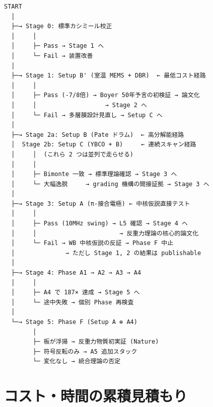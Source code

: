 \documentclass[11pt,a4paper]{article}
\begin{document}
\begin{tcolorbox}[colback=gray!5,colframe=gray!50!black,title=実験順序の決定木]
\small
\begin{verbatim}
START
  │
  ├─→ Stage 0: 標準カシミール校正
  │     │
  │     ├─ Pass → Stage 1 へ
  │     └─ Fail → 装置改善
  │
  ├─→ Stage 1: Setup B' (室温 MEMS + DBR)  ← 最低コスト経路
  │     │
  │     ├─ Pass (-7/8倍) → Boyer 50年予言の初検証 → 論文化
  │     │                   → Stage 2 へ
  │     └─ Fail → 多層膜設計見直し → Setup C へ
  │
  ├─→ Stage 2a: Setup B (Pate ドラム)  ← 高分解能経路
  │  Stage 2b: Setup C (YBCO + B)     ← 連続スキャン経路
  │     │  (これら 2 つは並列で走らせる)
  │     │
  │     ├─ Bimonte 一致 → 標準理論確認 → Stage 3 へ
  │     └─ 大幅逸脱     → grading 機構の間接証拠 → Stage 3 へ
  │
  ├─→ Stage 3: Setup A (π-接合電極) ← 中核仮説直接テスト
  │     │
  │     ├─ Pass (10MHz swing) → L5 確認 → Stage 4 へ
  │     │                       → 反重力理論の核心的論文化
  │     └─ Fail → WB 中核仮説の反証 → Phase F 中止
  │              → ただし Stage 1, 2 の結果は publishable
  │
  ├─→ Stage 4: Phase A1 → A2 → A3 → A4
  │     │
  │     ├─ A4 で 187× 達成 → Stage 5 へ
  │     └─ 途中失敗 → 個別 Phase 再検査
  │
  └─→ Stage 5: Phase F (Setup A ⊕ A4)
        │
        ├─ 板が浮揚 → 反重力物質初実証 (Nature)
        ├─ 符号反転のみ → A5 追加スタック
        └─ 変化なし → 統合理論の否定
\end{verbatim}
\end{tcolorbox}

\section{コスト・時間の累積見積もり}
\end{document}
